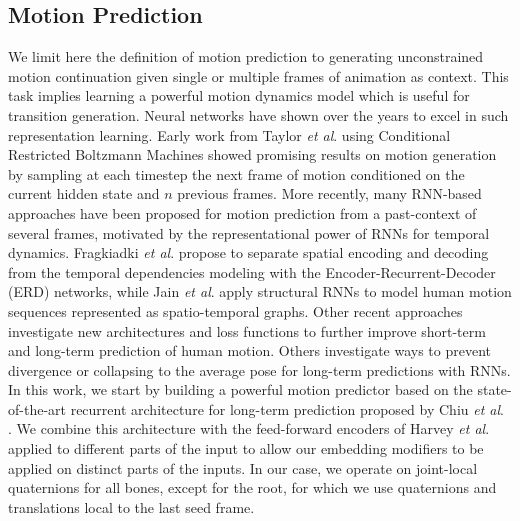 \documentclass[acmtog]{acmart}
\newcommand{\etal}{\textit{et al}. }
\begin{document}
\subsection{Motion Prediction}
We limit here the definition of motion prediction to generating unconstrained motion continuation given single or multiple frames of animation as context. This task implies learning a powerful motion dynamics model which is useful for transition generation.
Neural networks have shown over the years to excel in such representation learning. Early work from Taylor \etal {} using Conditional Restricted Boltzmann Machines showed promising results on motion generation by sampling at each timestep the next frame of motion conditioned on the current hidden state and $n$ previous frames. More recently, many RNN-based approaches have been proposed for motion prediction from a past-context of several frames, motivated by the representational power of RNNs for temporal dynamics. Fragkiadki \etal {} propose to separate spatial encoding and decoding from the temporal dependencies modeling with the Encoder-Recurrent-Decoder (ERD) networks, while Jain \etal {} apply structural RNNs to model human motion sequences represented as spatio-temporal graphs. 
Other recent approaches \cite{martinez2017human, tang2018long, chiu2019action, gopalakrishnan2019neural, liu2019towards, pavllo2019modeling} investigate new architectures and loss functions to further improve short-term and long-term prediction of human motion. Others \cite{li2017auto, ghosh2017learning} investigate ways to prevent divergence or collapsing to the average pose for long-term predictions with RNNs. In this work, we start by building a powerful motion predictor based on the state-of-the-art recurrent architecture for long-term prediction proposed by Chiu \etal {}.
We combine this architecture with the feed-forward encoders of Harvey \etal {} applied to different parts of the input to allow our embedding modifiers to be applied on distinct parts of the inputs. In our case, we operate on joint-local quaternions for all bones, except for the root, for which we use quaternions and translations local to the last seed frame.  
\end{document}
